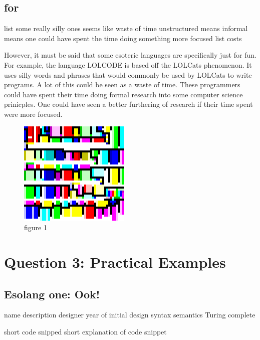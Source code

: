 \documentclass[a4paper]{article}
\begin{document}
	\subsection{for}
	list some really silly ones
	seems like waste of time
	unstructured means informal means one could have spent the time doing something more focused
	list costs
	
	However, it must be said that some esoteric languages are specifically just for fun. For example, the language LOLCODE is based off the LOLCats phenomenon\cite{esolangArt}. It uses silly words and phrases that would commonly be used by LOLCats to write programs. A lot of this could be seen as a waste of time. These programmers could have spent their time doing formal research into some computer science prinicples. One could have seen a better furthering of research if their time spent were more focused. 
	
			\begin{figure}[h]
			\centering
			\includegraphics[width=200px]{helloworld-piet.png}
			\caption{figure 1}
		\end{figure}
\section{Question 3: Practical Examples}
	\subsection{Esolang one: Ook!}
	name
	description
		designer
		year of initial design
		syntax
		semantics
		Turing complete
		
	short code snipped
	short explanation of code snippet
	
\end{document}
